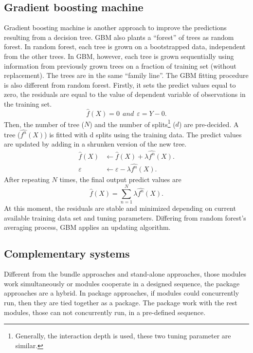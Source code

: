 \documentclass[12pt,a4paper]{article}
\begin{document}
\subsection*{Gradient boosting machine}

Gradient boosting machine \citep[GBM,][]{Friedman2001,Friedman2002} is another approach to improve the predictions resulting from a decision tree. GBM also plants a ``forest'' of trees as random forest. In random forest, each tree is grown on a bootstrapped data, independent from the other trees. In GBM, however, each tree is grown sequentially using information from previously grown trees on a fraction of training set (without replacement). The trees are in the same ``family line''. The GBM fitting procedure is also different from random forest. Firstly, it sets the predict values equal to zero, the residuals are equal to the value of dependent variable of observations in the training set.
\begin{equation}
\hat{f}(X) = 0~~and~~\varepsilon = Y - 0.
\end{equation}
Then, the number of tree ($N$) and the number of splits\footnote{Generally, the interaction depth is used, these two tuning parameter are similar.} ($d$) are pre-decided. A tree ($\hat{f^n}(X)$) is fitted with d splits using the training data.  The predict values are updated by adding in a shrunken version of the new tree.
\begin{equation}
\begin{split}
\hat{f}(X) &\leftarrow \hat{f}(X) + \lambda\hat{f^n}(X).\\
\varepsilon &\leftarrow \varepsilon - \lambda\hat{f^n}(X).
\end{split}
\end{equation}
After repeating $N$ times, the final output predict values are
\begin{equation}
\hat{f}(X) = \sum_{n=1}^N \lambda\hat{f^n}(X).
\end{equation}
At this moment, the residuals are stable and minimized depending on current available training data set and tuning parameters. Differing from random forest's averaging process, GBM applies an updating algorithm.

\subsection{Complementary systems}

Different from the bundle approaches and stand-alone approaches, those modules work simultaneously or modules cooperate in a designed sequence, the package approaches are a hybrid. In package approaches, if modules could concurrently run, then they are tied together as a package. The package work with the rest modules, those can not concurrently run, in a pre-defined sequence.
\end{document}
